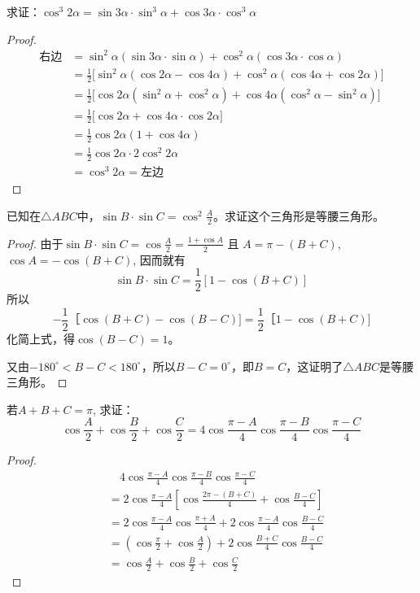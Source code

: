 \begin{example}
求证：$\cos^3 2\alpha= \sin 3\alpha\cdot \sin^3\alpha+\cos 3\alpha\cdot \cos^3\alpha$
\end{example}

\begin{proof}
\[\begin{split}
\text{右边}&=\sin^2\alpha(\sin3\alpha\cdot \sin\alpha)+\cos^2\alpha(\cos3\alpha\cdot\cos\alpha)\\
&=\frac{1}{2}\big[\sin^2\alpha(\cos2\alpha-\cos4\alpha)+\cos^2\alpha(\cos4\alpha+\cos2\alpha)\big]\\
&=\frac{1}{2}\big[\cos 2\alpha(\sin^2\alpha+\cos^2\alpha)+\cos4\alpha(\cos^2\alpha-\sin^2\alpha)\big]\\
&=\frac{1}{2}\big[\cos2\alpha+\cos4\alpha\cdot\cos2\alpha\big]\\
&=\frac{1}{2}\cos2\alpha(1+\cos4\alpha)\\
&=\frac{1}{2}\cos2\alpha\cdot 2\cos^2 2\alpha\\
&=\cos^3 2\alpha=\text{左边}
\end{split}\]
\end{proof}

    

\begin{example}
    已知在$\triangle ABC$中，$\sin B\cdot \sin C=\cos^2\frac{A}{2}$。求证这个三角形是等腰三角形。
\end{example}


\begin{proof}
由于$\sin B\cdot \sin C=\cos\frac{A}{2}=\frac{1+\cos A}{2}$
且 $A=\pi-(B+C)$, $\cos A=-\cos(B+C)$, 因而就有
\[\sin B\cdot \sin C =\frac{1}{2} [1-\cos (B+C) ] \]
所以
\[-\frac{1}{2}［\cos (B+C) -\cos (B-C) ]
=\frac{1}{2}［1-\cos (B+C)]\]
化简上式，得$\cos (B-C) =1$。

又由$-180^{\circ}<B-C<180^{\circ}$，所以$B-C=0^{\circ}$，即$B=C$，这证明了$\triangle ABC$是等腰三角形。    
\end{proof}


\begin{example}
若$A+B+C=\pi$, 求证：
$$\cos\frac{A}{2}+\cos \frac{B}{2}+\cos \frac{C}{2}=4\cos\frac{\pi-A}{4}\cos\frac{\pi-B}{4}\cos\frac{\pi-C}{4}$$  
\end{example}

\begin{proof}
\[\begin{split}
&\quad  4\cos\frac{\pi-A}{4}\cos\frac{\pi-B}{4}\cos\frac{\pi-C}{4}\\
&= 2\cos\frac{\pi-A}{4}\left[\cos\frac{2\pi-(B+C)}{4}+\cos\frac{B-C}{4}\right]\\
&= 2\cos\frac{\pi-A}{4}  \cos\frac{\pi+A}{4} +2\cos\frac{\pi-A}{4} \cos\frac{B-C}{4} \\
&=\left(\cos\frac{\pi}{2}+\cos\frac{A}{2}\right)+2\cos\frac{B+C}{4}\cos\frac{B-C}{4}   \\
&=\cos\frac{A}{2}+\cos \frac{B}{2}+\cos \frac{C}{2}
\end{split}\] 
\end{proof}


